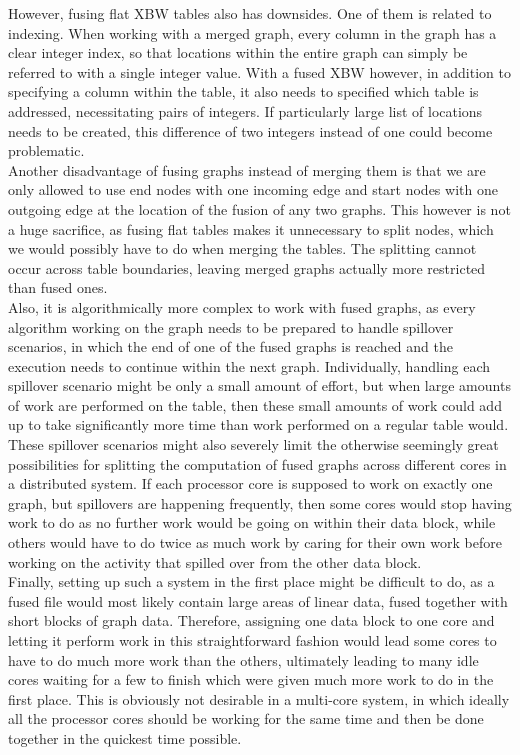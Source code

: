 \documentclass[a4paper,12pt,twoside,BCOR=10mm]{scrbook}
\begin{document}
However, fusing flat XBW tables also has downsides.
One of them is related to indexing.
When working with a merged graph, every column in the graph has a clear integer index,
so that locations within the entire graph can simply be referred to with a single integer value.
With a fused XBW however, in addition to specifying a column within the table,
it also needs to specified which table is addressed, necessitating pairs of integers.
If particularly large list of locations needs to be created, this difference of two integers instead of one
could become problematic. \\
Another disadvantage of fusing graphs instead of merging them is that we
are only allowed to use end nodes with one incoming edge and start nodes with one outgoing edge
at the location of the fusion of any two graphs.
This however is not a huge sacrifice, as fusing flat tables makes it unnecessary to
split nodes, which we would possibly have to do when merging the tables.
The splitting cannot occur across table boundaries, leaving merged graphs
actually more restricted than fused ones. \\
Also, it is algorithmically more complex to work with fused graphs, as every
algorithm working on the graph needs to be prepared to handle spillover scenarios,
in which the end of one of the fused graphs is reached and the execution needs to continue
within the next graph.
Individually, handling each spillover scenario might be only a small amount of effort,
but when large amounts of work are performed on the table, then these small amounts of work
could add up to take significantly more time than work performed on a regular table would. \\
These spillover scenarios might also severely limit the otherwise seemingly
great possibilities for splitting the computation of fused graphs across different
cores in a distributed system.
If each processor core is supposed to work on exactly one graph,
but spillovers are happening frequently, then some cores would stop having work
to do as no further work would be going on within their data block,
while others would have to do twice as much work by caring for their
own work before working on the activity that spilled over from the other data block. \\
Finally, setting up such a system in the first place might be difficult to do,
as a fused file would most likely contain large areas of linear data,
fused together with short blocks of graph data. Therefore, assigning one
data block to one core and letting it perform work in this straightforward fashion
would lead some cores to have to do much more work than the others, ultimately
leading to many idle cores waiting for a few to finish which were given much more work
to do in the first place. This is obviously not desirable in a multi-core system,
in which ideally all the processor cores should be working for the same time
and then be done together in the quickest time possible.
\end{document}
